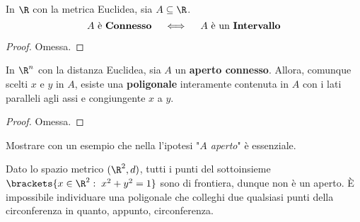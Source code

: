 \begin{proposition}
	\label{prop:in_Rn_connesso_sse_intervallo}
	In $\R$ con la metrica Euclidea, sia $A \subseteq \R$.
	\[A \text{ è \textbf{Connesso}} \quad \iff \quad A \text{ è un \textbf{Intervallo}}\]
	\begin{proof}
		Omessa.
	\end{proof}
\end{proposition}
\begin{proposition}
	\label{prop:polig_in_aperto_connesso}
	In $\R^n$ con la distanza Euclidea, sia $A$ un \textbf{aperto connesso}. Allora, comunque scelti $x$ e $y$ in $A$, esiste una \textbf{poligonale} interamente contenuta in $A$ con i lati paralleli agli assi e congiungente $x$ a $y$.
	\begin{proof}
		Omessa.
	\end{proof}
\end{proposition}
\begin{exercise}
	Mostrare con un esempio che nella  l'ipotesi "\textit{$A$ aperto}" è essenziale.
	\begin{solution}
		Dato lo spazio metrico $(\R^2,d)$, tutti i punti del sottoinsieme $\brackets{x \in \R^2:\;x^2 + y^2 = 1}$ sono di frontiera, dunque non è un aperto. È impossibile individuare una poligonale che colleghi due qualsiasi punti della circonferenza in quanto, appunto, circonferenza.
	\end{solution}
\end{exercise}

